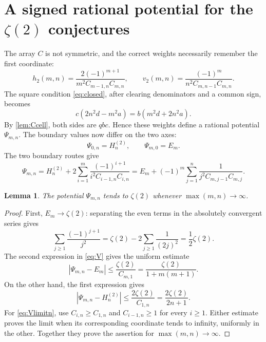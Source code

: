 \documentclass[11pt,letterpaper]{article}
\numberwithin{equation}{section}
\newtheorem{lemma}[theorem]{Lemma}
\theoremstyle{definition}
\newcommand{\Hh}[2]{H_{#1}^{(#2)}}
\newcommand{\ztwo}{\zeta(2)}
\begin{document}
\section{A signed rational potential for the \texorpdfstring{$\zeta(2)$}{zeta(2)} conjectures}\label{sec:zeta2proof}

The array $C$ is not symmetric, and the correct weights necessarily
remember the first coordinate:
\begin{equation}\label{eq:edges2}
 h_2(m,n)=\frac{2(-1)^{m+1}}{m^2C_{m-1,n}C_{m,n}},\qquad
 v_2(m,n)=\frac{(-1)^m}{n^2C_{m,n-1}C_{m,n}}.
\end{equation}
The square condition \eqref{eq:closed}, after clearing denominators and
a common sign, becomes
\begin{equation}\label{eq:closed2check}
 c(2n^2d-m^2a)=b(m^2d+2n^2a).
\end{equation}
By \cref{lem:Ccell}, both sides are $qbc$. Hence these weights define
a rational potential $\Psi_{m,n}$. The boundary values now differ on the
two axes:
\[
 \Psi_{0,n}=\Hh{n}{2},\qquad \Psi_{m,0}=E_m.
\]
The two boundary routes give
\begin{equation}\label{eq:V}
 \boxed{\displaystyle
 \Psi_{m,n}=\Hh{n}{2}+2\sum_{i=1}^{m}
 \frac{(-1)^{i+1}}{i^2C_{i-1,n}C_{i,n}}
 =E_m+(-1)^m\sum_{j=1}^{n}
 \frac1{j^2C_{m,j-1}C_{m,j}}.}
\end{equation}

\begin{lemma}\label{lem:Vlimit}
The potential $\Psi_{m,n}$ tends to $\ztwo$ whenever
$\max(m,n)\to\infty$.
\end{lemma}
\begin{proof}
First, $E_m\to\ztwo$: separating the even terms in the absolutely
convergent series gives
\[
 \sum_{j\geq1}\frac{(-1)^{j+1}}{j^2}
 =\ztwo-2\sum_{j\geq1}\frac1{(2j)^2}=\frac12\ztwo.
\]
The second expression in \eqref{eq:V} gives the uniform estimate
\begin{equation}\label{eq:Vlimitm}
 |\Psi_{m,n}-E_m|\leq\frac{\ztwo}{C_{m,1}}
 =\frac{\ztwo}{1+m(m+1)}.
\end{equation}
On the other hand, the first expression gives
\begin{equation}\label{eq:Vlimitn}
 |\Psi_{m,n}-\Hh{n}{2}|
 \leq\frac{2\ztwo}{C_{1,n}}=\frac{2\ztwo}{2n+1}.
\end{equation}
For \eqref{eq:Vlimitn}, use $C_{i,n}\geq C_{1,n}$ and
$C_{i-1,n}\geq1$ for every $i\geq1$. Either estimate proves the
limit when its corresponding coordinate tends to infinity, uniformly
in the other. Together they prove the assertion for
$\max(m,n)\to\infty$.
\end{proof}
\end{document}
